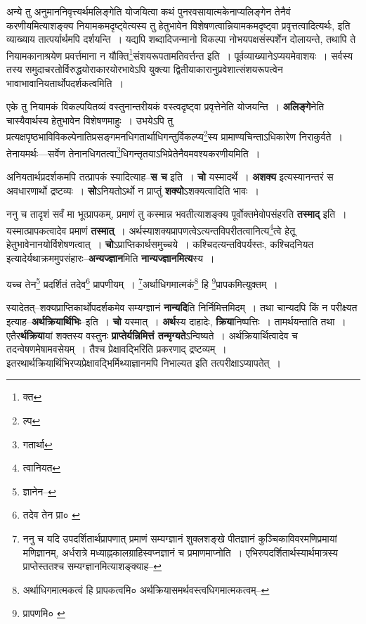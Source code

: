 \documentclass[article,12pt,a4paper]{memoir}
\begin{document}
	  \pstart अन्ये तु अनुमाननिवृत्त्यर्थमलिङ्गेति योजयित्वा कथं पुनरवसायात्मकेनाप्यलिङ्गेन तेनैवं करणीयमित्याशङ्क्य नियामकमदृष्ट्वेत्यस्य तु हेतुभावेन विशेषणत्वान्नियामकमदृष्ट्वा प्रवृत्तत्वादित्यर्थः, इति व्याख्याय तात्पर्यार्थमपि दर्शयन्ति । यद्यपि शब्दादिजन्मानो विकल्पा नोभयपक्षसंस्पर्शेन दोलायन्ते, तथापि ते नियामकानाश्रयेण प्रवर्त्तमाना न यौक्ति\footnote{क्त}संशयरूपतामतिवर्त्तन्त इति । पूर्वव्याख्यानेऽप्ययमेवाशयः । सर्वस्य तस्य समुदाचरतोर्विरुद्धयोराकारयोरभावेऽपि युक्त्या द्वितीयाकारानुप्रवेशात्संशयरूपत्वेन भावाभावानियतार्थोपदर्शकत्वमिति ।
	\pend
      

	  \pstart एके तु नियामकं विकल्पयितव्यं वस्तुनान्तरीयकं वस्त्वदृष्ट्वा प्रवृत्तेनेति योजयन्ति । \textbf{अलिङ्गे}नेति चास्यैवार्थस्य हेतुभावेन विशेषणमाहुः । उभयेऽपि तु प्रत्यक्षपृष्ठभाविविकल्पेनातिप्रसङ्गमनधिगतार्थाधिगन्तुर्विकल्प्य\footnote{ल्प}स्य प्रामाण्यचिन्ताऽधिकारेण निराकुर्वते । तेनायमर्थः—सर्वेण तेनानधिगतत्वा\footnote{गतार्था}धिगन्तृतयाऽभिप्रेतेनैवमवश्यकरणीयमिति ।
	\pend
      

	  \pstart अनियतार्थप्रदर्शकमपि तत्प्रापकं स्यादित्याह--\textbf{स च} इति । \textbf{चो} यस्मादर्थे । \textbf{अशक्य} इत्यस्यानन्तरं स अवधारणार्थो द्रष्टव्यः । \textbf{सो}ऽनियतोऽर्थो न प्राप्तुं \textbf{शक्यो}ऽशक्यत्वादिति भावः ।
	\pend
      

	  \pstart ननु च तादृशं सर्वं मा भूत्प्रापकम्, प्रमाणं तु कस्मान्न भवतीत्याशङ्क्य पूर्वोक्तमेवोपसंहरति \textbf{तस्माद्} इति । यस्मात्प्रापकत्वादेव प्रमाणं \textbf{तस्मात्} । अर्थस्याशक्यप्रापणत्वेऽत्यन्तविपरीतत्वानित्य\footnote{त्वानियत}त्वे हेतू हेतुभावेनानयोर्विशेषणत्वात् । \textbf{चो}ऽप्राप्तिकार्थसमुच्चये । कश्चिदत्यन्तविपर्यस्तः, कश्चिदनियत इत्यादेर्यथाक्रममुपसंहारः--\textbf{अन्यज्ज्ञान}मिति \textbf{नान्यज्ज्ञानमित्य}स्य ।
	\pend
      \leavevmode{}
	  \bigskip
	  \begingroup
	

	  \pstart यच्च तेन\footnote{ज्ञानेन--\cite{dp-msD-n}} प्रदर्शितं तदेव\footnote{तदेव तेन प्रा० \cite{dp-msC} \cite{dp-msD}} प्रापणीयम् । \footnote{ननु च यदि उपदर्शितार्थप्रापणात् प्रमाणं सम्यग्ज्ञानं शुक्लशङ्खे पीतज्ञानं कुञ्चिकाविवरमणिप्रमायां मणिज्ञानम्, अर्धरात्रे मध्याह्नकालग्राहिस्वप्नज्ञानं च प्रमाणमाप्नोति । एभिरुपदर्शितार्थस्यार्थमात्रस्य प्राप्तेस्ततश्च सम्यग्ज्ञानमित्याशङ्क्याह--\cite{dp-msD-n}}अर्थाधिगमात्मकं\footnote{अर्थाधिगमात्मकत्वं हि प्रापकत्वमि० \cite{dp-msC} \cite{dp-msD} अर्थक्रियासमर्थवस्त्वधिगमात्मकत्वम्--\cite{dp-msB}} हि \footnote{प्रापणमि० \cite{dp-edN}}प्रापकमित्युक्तम् ।
	\pend
      
	  \endgroup
	

	  \pstart स्यादेतत्--शक्यप्राप्तिकार्थोपदर्शकमेव सम्यग्ज्ञानं\leavevmode{} \textbf{नान्यदि}ति निर्निमित्तमिदम् । तथा चान्यदपि किं न परीक्ष्यत इत्याह--\textbf{अर्थक्रियार्थिभिः}--इति । \textbf{चो} यस्मात् । \textbf{अर्थ}स्य दाहादेः, \textbf{क्रिया}निष्पत्तिः । तामर्थयन्ताति तथा । एतैर\textbf{र्थक्रिया}यां शक्तस्य वस्तुनः \textbf{प्राप्तेर्यन्निमित्तं तन्मृग्यते}ऽन्विष्यते । अर्थक्रियार्थित्वादेव च तदन्वेषणमेषामवसेयम् । तैश्च प्रेक्षावद्भिरिति प्रकरणाद् द्रष्टव्यम् । इतरथार्थक्रियार्थिभिरप्यप्रेक्षावद्भिर्मिथ्याज्ञानमपि निभाल्यत इति तत्परीक्षाऽप्यापतेत् ।
	\pend
      
\end{document}
